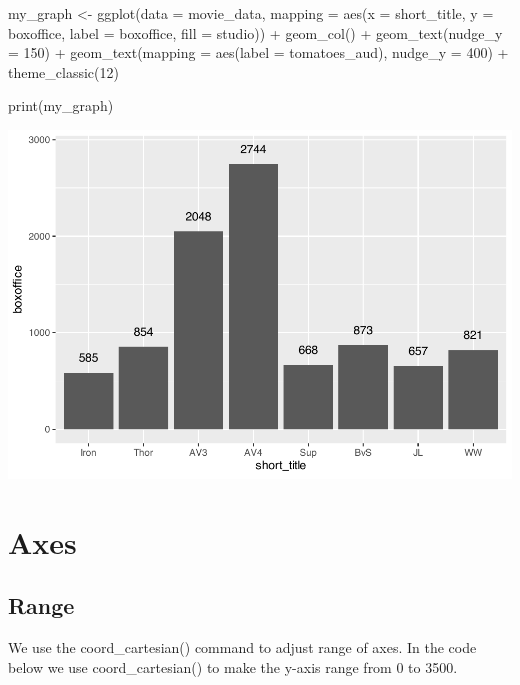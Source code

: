 \documentclass[
]{krantz}
\makeatletter
\newenvironment{Shaded}{\begin{snugshade}}{\end{snugshade}}
\newcommand{\AttributeTok}[1]{\textcolor[rgb]{0.61,0.61,0.61}{#1}}
\newcommand{\DecValTok}[1]{\textcolor[rgb]{0.06,0.06,0.06}{#1}}
\newcommand{\FunctionTok}[1]{\textcolor[rgb]{0,0,0}{#1}}
\newcommand{\NormalTok}[1]{#1}
\newcommand{\OtherTok}[1]{\textcolor[rgb]{0.37,0.37,0.37}{#1}}
\newcommand{\SpecialCharTok}[1]{\textcolor[rgb]{0,0,0}{#1}}
\newenvironment{kframe}{%
\medskip{}
\setlength{\fboxsep}{.8em}
 \def\at@end@of@kframe{}%
 \ifinner\ifhmode%
  \def\at@end@of@kframe{\end{minipage}}%
  \begin{minipage}{\columnwidth}%
 \fi\fi%
 \def\FrameCommand##1{\hskip\@totalleftmargin \hskip-\fboxsep
 \colorbox{shadecolor}{##1}\hskip-\fboxsep
     \hskip-\linewidth \hskip-\@totalleftmargin \hskip\columnwidth}%
 \MakeFramed {\advance\hsize-\width
   \@totalleftmargin\z@ \linewidth\hsize
   \@setminipage}}%
 {\par\unskip\endMakeFramed%
 \at@end@of@kframe}
\renewenvironment{Shaded}{\begin{kframe}}{\end{kframe}}
\makeatother
\begin{document}
\begin{Shaded}
\begin{Highlighting}[]
\NormalTok{my\_graph }\OtherTok{\textless{}{-}} \FunctionTok{ggplot}\NormalTok{(}\AttributeTok{data =}\NormalTok{ movie\_data,}
           \AttributeTok{mapping =} \FunctionTok{aes}\NormalTok{(}\AttributeTok{x =}\NormalTok{ short\_title,}
                         \AttributeTok{y =}\NormalTok{ boxoffice,}
                         \AttributeTok{label =}\NormalTok{ boxoffice, }
                         \AttributeTok{fill =}\NormalTok{ studio)) }\SpecialCharTok{+}
  \FunctionTok{geom\_col}\NormalTok{() }\SpecialCharTok{+}
  \FunctionTok{geom\_text}\NormalTok{(}\AttributeTok{nudge\_y =} \DecValTok{150}\NormalTok{)  }\SpecialCharTok{+}
  \FunctionTok{geom\_text}\NormalTok{(}\AttributeTok{mapping =} \FunctionTok{aes}\NormalTok{(}\AttributeTok{label =}\NormalTok{ tomatoes\_aud), }
            \AttributeTok{nudge\_y =} \DecValTok{400}\NormalTok{) }\SpecialCharTok{+}
  \FunctionTok{theme\_classic}\NormalTok{(}\DecValTok{12}\NormalTok{)}

\FunctionTok{print}\NormalTok{(my\_graph)}
\end{Highlighting}
\end{Shaded}

\includegraphics[width=0.65\linewidth]{bookdown_files/figure-latex/unnamed-chunk-113-1}

\hypertarget{axes}{%
\section{Axes}\label{axes}}

\hypertarget{range}{%
\subsection{Range}\label{range}}

We use the coord\_cartesian() command to adjust range of axes. In the code below we use coord\_cartesian() to make the y-axis range from 0 to 3500.
\end{document}
